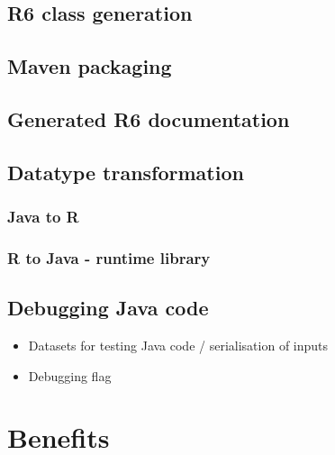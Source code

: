 \hypertarget{r6-class-generation}{%
\subsection{R6 class generation}\label{r6-class-generation}}

\hypertarget{maven-packaging}{%
\subsection{Maven packaging}\label{maven-packaging}}

\hypertarget{generated-r6-documentation}{%
\subsection{Generated R6
documentation}\label{generated-r6-documentation}}

\hypertarget{datatype-transformation}{%
\subsection{Datatype transformation}\label{datatype-transformation}}

\hypertarget{java-to-r}{%
\subsubsection{Java to R}\label{java-to-r}}

\hypertarget{r-to-java---runtime-library}{%
\subsubsection{R to Java - runtime
library}\label{r-to-java---runtime-library}}

\hypertarget{debugging-java-code}{%
\subsection{Debugging Java code}\label{debugging-java-code}}

\begin{itemize}
\tightlist
\item
  Datasets for testing Java code / serialisation of inputs
\item
  Debugging flag
\end{itemize}

\hypertarget{benefits}{%
\section{Benefits}\label{benefits}}

